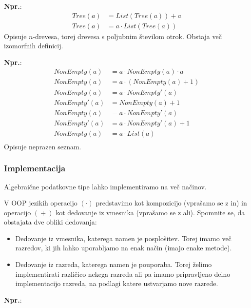 \documentclass{report}
\newcommand{\Ex}{\textbf{Npr.}:\ }
\newcommand{\Seq}{\cdot}
\newcommand{\Sum}{\mathrel{+}}
\newcommand{\Var}[1]{{#1}}
\begin{document}
\Ex
\begin{equation*}
  \begin{aligned}
  Tree(\Var{a}) &= List(Tree(\Var{a})) \Sum \Var{a}\\
  Tree(\Var{a}) &= \Var{a} \Seq List(Tree(\Var{a}))
  \end{aligned}
\end{equation*}
Opisuje $n$-drevesa, torej drevesa s poljubnim številom otrok.
Obstaja več izomorfnih definicij.

\Ex
\begin{equation*}
  \begin{aligned}
    NonEmpty(\Var{a}) &= a \Seq NonEmpty(\Var{a}) \Seq a\\
    NonEmpty(\Var{a}) &= a \Seq (NonEmpty(\Var{a}) \Sum 1)\\[1em] 
    NonEmpty(\Var{a}) &= a \Seq NonEmpty'(\Var{a})\\
    NonEmpty'(\Var{a}) &= NonEmpty(\Var{a}) \Sum 1\\[1em]
    NonEmpty(\Var{a}) &= a \Seq NonEmpty'(\Var{a})\\
    NonEmpty'(\Var{a}) &= a \Seq NonEmpty'(\Var{a}) \Sum 1\\[1em]
    NonEmpty(\Var{a}) &= a \Seq List(\Var{a})\\
  \end{aligned}
\end{equation*}
Opisuje neprazen seznam.

\subsubsection*{Implementacija}
Algebraične podatkovne tipe lahko implementiramo na več načinov.

V OOP jezikih operacijo $(\Seq)$ predstavimo kot kompozicijo (vprašamo se z in) in operacijo $(\Sum)$ kot dedovanje iz vmesnika (vprašamo se z ali).
Spomnite se, da obstajata dve obliki dedovanja:
\begin{itemize}
  \item Dedovanje iz vmesnika, katerega namen je posplošitev.
    Torej imamo več razredov, ki jih lahko uporabljamo na enak način (imajo enake metode).
  \item Dedovanje iz razreda, katerega namen je pouporaba.
    Torej želimo implementirati različico nekega razreda ali pa imamo pripravljeno delno implementacijo razreda, na podlagi katere ustvarjamo nove razrede.
\end{itemize}

\Ex
\end{document}
